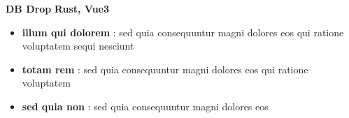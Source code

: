 \documentclass[a4paper,10pt]{article}
\begin{document}
\begin{paracol}{2}
\begin{flushleft}
  \textbf{DB Drop} \hfill \textbf{Rust, Vue3} \\
  \begin{itemize}[left=0pt,label={--},nosep]
    \item \textbf{illum qui dolorem} : sed quia consequuntur magni dolores eos qui ratione voluptatem sequi nesciunt
    \item \textbf{totam rem} : sed quia consequuntur magni dolores eos qui ratione voluptatem
    \item \textbf{sed quia non} : sed quia consequuntur magni dolores eos
  \end{itemize}
  \vspace{1em}

  \end{flushleft}
  
\end{paracol}
\end{document}

